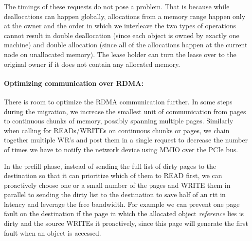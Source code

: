 The timings of these requests do not pose a problem. That is
because while deallocations can happen globally, allocations from a memory range
happen only at the owner and the order in which we interleave the two types of
operations cannot result in double deallocation (since each object is owned by
exactly one machine) and double allocation (since all of the allocations happen
at the current node on unallocated memory). The lease holder can turn the lease
over to the original owner if it does not contain any allocated memory.

\paragraph{Optimizing communication over RDMA:} There is room to optimize
the RDMA communication further. In some steps during the migration, we
increase the smallest unit of communication from pages to continuous chunks
of memory, possibly spanning multiple pages. Similarly when calling for
READs/WRITEs on continuous chunks or pages, we chain together multiple
WR's and post them in a single request to decrease the number of times we
have to notify the network device using MMIO over the PCIe bus.

In the prefill phase, instead of sending the full list of dirty pages to the
destination so that it can prioritize which of them to READ first, we can
proactively choose one or a small number of the pages and WRITE them in
parallel to sending the dirty list to the destination to save half of an rtt
in latency and leverage the free bandwidth.
For example we can prevent one page fault on the destination
if the page in which the allocated object \emph{reference} lies is dirty and
the source WRITEs it proactively, since this page will generate the first
fault when an object is accessed.

